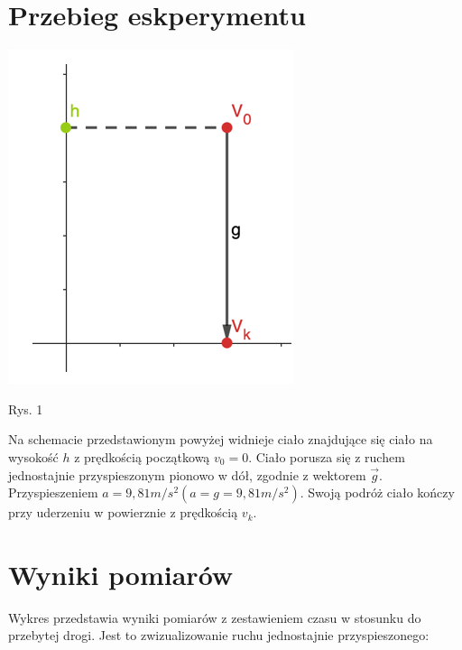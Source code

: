 \documentclass{article}
\begin{document}
\section{Przebieg eskperymentu}


\begin{center}
\includegraphics[scale=1.0]{1.png}


Rys. 1
\end{center}

\begin{flushleft}
    Na schemacie przedstawionym powyżej widnieje ciało znajdujące się ciało na wysokość $h$ z prędkością początkową $v_{0} = 0$. Ciało porusza się z ruchem jednostajnie przyspieszonym pionowo w dół, zgodnie z wektorem $\vec{g}$. Przyspieszeniem $a = 9,81 {m/s^2} (a = g = 9,81 m/s^2)$. Swoją podróż ciało kończy przy uderzeniu w powierznie z prędkością $v_{k}.$
\end{flushleft}
\section{Wyniki pomiarów}

    Wykres przedstawia wyniki pomiarów z zestawieniem czasu w stosunku do przebytej drogi. Jest to zwizualizowanie ruchu jednostajnie przyspieszonego: 

\end{document}

